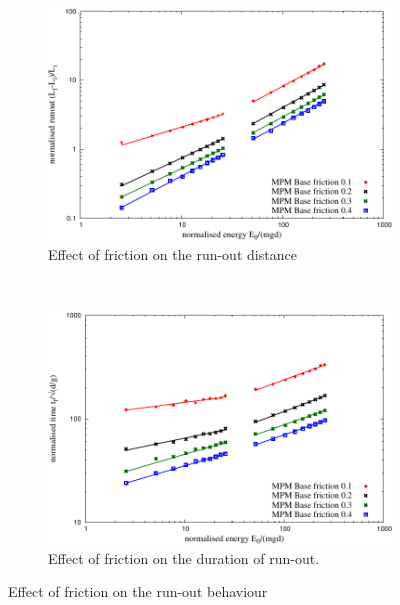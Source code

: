 \begin{figure}[tbhp]
\centering
\begin{subfigure}[b]{0.95\textwidth}
\centering
\includegraphics[width=\textwidth]{runout_fric_slope}
\caption{Effect of friction on the run-out distance}
\label{fig:runout_fric_slope}
\end{subfigure}
\\
\begin{subfigure}[b]{0.95\textwidth}
\centering
\includegraphics[width=\textwidth]{time_fric_slope}
\caption{Effect of friction on the duration of run-out.}
\label{fig:time_fric_slope}
\end{subfigure}
\caption{Effect of friction on the run-out behaviour}
\label{fig:fric_slope}
\end{figure}



